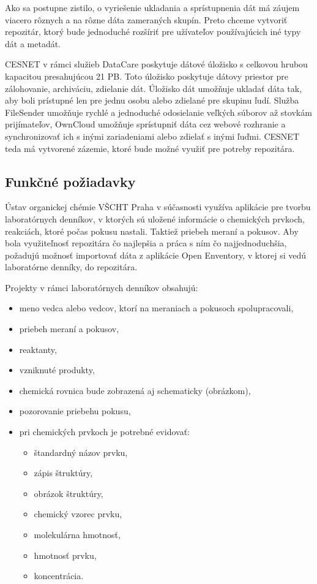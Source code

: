 \documentclass[thesis=M,slovak]{FITthesis}[2013/05/06]
\begin{document}
Ako sa postupne zistilo, o vyriešenie ukladania a sprístupnenia dát má záujem viacero rôznych a na rôzne dáta zameraných skupín. Preto chceme vytvoriť repozitár, ktorý bude jednoduché rozšíriť pre užívateľov používajúcich iné typy dát a metadát.

CESNET v rámci služieb DataCare poskytuje dátové úložisko s celkovou hrubou kapacitou presahujúcou 21 PB. Toto úložisko poskytuje dátovy priestor pre zálohovanie, archiváciu, zdielanie dát. \cite{DataCare} Úložisko dát umožňuje ukladať dáta tak, aby boli prístupné len pre jednu osobu alebo zdielané pre skupinu ľudí. Služba FileSender umožňuje rychlé a jednoduché odosielanie veľkých súborov až stovkám prijímateľov, OwnCloud umožňuje sprístupniť dáta cez webové rozhranie a synchronizovať ich s inými zariadeniami alebo zdielať s inými ľuďmi. \cite {DatoveUloziste} CESNET teda má vytvorené zázemie, ktoré bude možné využiť pre potreby repozitára.

\subsection{Funkčné požiadavky}

Ústav organickej chémie VŠCHT Praha v súčasnosti využíva aplikácie pre tvorbu laboratórnych denníkov, v ktorých sú uložené informácie o chemických prvkoch, reakciách, ktoré počas pokusu nastali. Taktiež priebeh meraní a pokusov. Aby bola využiteľnosť repozitára čo najlepšia a práca s ním čo najjednoduchšia, požadujú možnosť importovať dáta z aplikácie Open Enventory, v ktorej si vedú laboratórne denníky, do repozitára. 

Projekty v rámci laboratórnych denníkov obsahujú: 
		\begin{itemize}
			\item meno vedca alebo vedcov, ktorí na meraniach a pokusoch spolupracovali,
			\item priebeh meraní a pokusov,
			\item reaktanty,
			\item vzniknuté produkty,
			\item chemická rovnica bude zobrazená aj schematicky (obrázkom),
			\item pozorovanie priebehu pokusu,
			\item pri chemických prvkoch je potrebné evidovať:
				\begin{itemize}
					\item štandardný názov prvku,
					\item zápis štruktúry,
					\item obrázok štruktúry,
					\item chemický vzorec prvku,
					\item molekulárna hmotnosť,
					\item hmotnosť prvku,
					\item koncentrácia.
				\end{itemize}
		\end{itemize}
\end{document}
